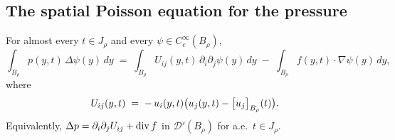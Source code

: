 \documentclass[11pt,reqno]{amsart}
\begin{document}
\subsection{The spatial Poisson equation for the pressure}\label{ss:poisson}

\begin{lemma}\label{lem:delta-p}
For almost every $t\in J_{\rho}$ and every $\psi\in C_{c}^{\infty}(B_{\rho})$,
\begin{equation}\label{eq:delta-p}
  \int_{B_{\rho}}p(y,t)\,\Delta\psi(y)\,dy
  \;=\;\int_{B_{\rho}}U_{ij}(y,t)\,\partial_{i}\partial_{j}\psi(y)\,dy
     \;-\;\int_{B_{\rho}}f(y,t)\cdot\nabla\psi(y)\,dy,
\end{equation}
where
\begin{equation}\label{eq:Uij}
  U_{ij}(y,t)\;=\;-\,u_{i}(y,t)\bigl(u_{j}(y,t)-\bigl[u_{j}\bigr]_{B_{\rho}}(t)\bigr).
\end{equation}
Equivalently, $\Delta p=\partial_{i}\partial_{j}U_{ij}+\operatorname{div} f$ in
$\mathcal{D}'(B_{\rho})$ for a.e.\ $t\in J_{\rho}$.
\end{lemma}
\end{document}

